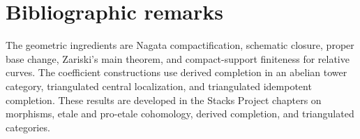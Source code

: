 \documentclass[10pt]{article}
\theoremstyle{definition}
\begin{document}
\section{Bibliographic remarks}

The geometric ingredients are Nagata compactification, schematic closure,
proper base change, Zariski's main theorem, and compact-support finiteness
for relative curves.  The coefficient constructions use derived
completion in an abelian tower category, triangulated central localization,
and triangulated idempotent completion.  These results are developed in the
Stacks Project chapters on morphisms, etale and pro-etale cohomology,
derived completion, and triangulated categories.
\end{document}
